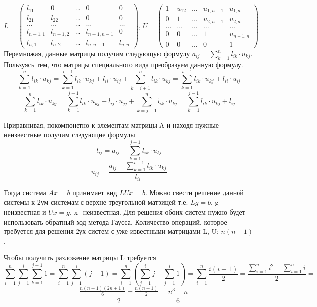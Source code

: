 \documentclass{article}
\begin{document}
\begin{enumerate}
	\[
	L = \begin{pmatrix}
		l_{11} & 0 & \ldots & 0 & 0 \\
		l_{21} & l_{22} & \ldots & 0 & 0 \\
		\ldots & \ldots & \ldots& \ldots& \ldots\\
		l_{n-1,1} & l_{n-1,2} & \ldots & l_{n-1,n-1}& 0\\
		l_{n,1} & l_{n,2} & \ldots & l_{n,n-1} & l_{n,n}
	\end{pmatrix}, \,
	U = \begin{pmatrix}
		1 & u_{12} & \ldots & u_{1,n-1} & u_{1,n} \\
		0 & 1 & \ldots & u_{2,n-1} & u_{2,n} \\
		\ldots & \ldots & \ldots& \ldots& \ldots\\
		0 & 0 & \ldots & 1& u_{n-1,n}\\
		0 & 0 & \ldots & 0 & 1
	\end{pmatrix}
	\]
	Перемножая, данные матрицы получим следующую формулу $\displaystyle a_{ij} = \sum_{k=1}^n l_{ik}\cdot u_{kj}$. Пользуясь тем, что матрицы специального вида преобразуем данную формулу.
	\[
	\sum_{k=1}^n l_{ik}\cdot u_{kj} = \sum_{k=1}^{i-1} l_{ik}\cdot u_{kj} + l_{ii} \cdot u_{ij} + \sum_{k=i+1}^{n} l_{ik}\cdot u_{kj} = \sum_{k=1}^{i-1} l_{ik}\cdot u_{kj} + l_{ii} \cdot u_{ij}
	\]
	\[
	\sum_{k=1}^n l_{ik}\cdot u_{kj} = \sum_{k=1}^{j-1} l_{ik}\cdot u_{kj} + l_{ij} \cdot u_{jj} + \sum_{k=j+1}^{n} l_{ik}\cdot u_{kj} = \sum_{k=1}^{j-1} l_{ik}\cdot u_{kj} + l_{ij}
	\]
	
	Приравнивая, покомпонетно к элементам матрицы A и находя нужные неизвестные получим следующие формулы
	\[
	l_{ij} = a_{ij} - \sum_{k=1}^{j-1} l_{ik}\cdot u_{kj}
	\]
	\[
	u_{ij} = \frac{a_{ij}-\sum_{k=1}^{i-1} l_{ik}\cdot u_{kj}}{l_{ii}}
	\]
	
	Тогда система $Ax = b$ принимает вид $LUx = b$. Можно свести решение данной системы к 2ум системам с верхне треугольной матрицей т.е. $Lg = b$, g -- неизвестная и $Ux = g$, x-- неизвестная. Для решения обоих систем нужно будет использовать обратный ход метода Гаусса. Количество операций, которое требуется для решения 2ух систем с уже известными матрицами L, U: $n(n-1)$.
	
	
	Чтобы получить разложение матрицы L требуется
	\[
		\sum_{i=1}^n \sum_{j=1}^i \sum_{k=1}^{j-1} 1 = \sum_{i=1}^n \sum_{j=1}^i (j-1) = \sum_{i=1}^n \left(\sum_{j=1}^i j- \sum_{j=1}^i 1\right) = \sum_{i=1}^n \frac{i(i-1)}{2} = \frac{\sum_{i=1}^n i^2 - \sum_{i=1}^n i}{2}=
	\]
	\[
	=\frac{\frac{n(n+1)(2n+1)}{6} - \frac{n(n+1)}{2}}{2} = \frac{n^3-n}{6}
	\]
	

\end{enumerate}
\end{document}
